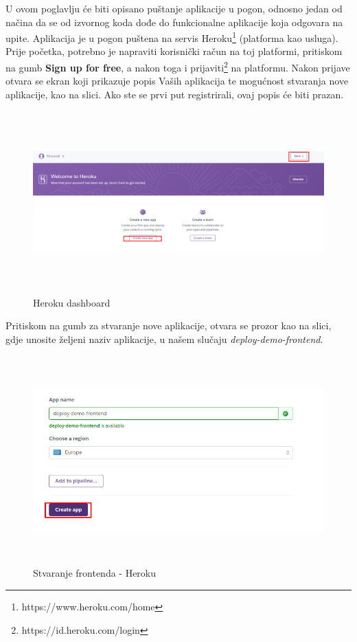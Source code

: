 			U ovom poglavlju će biti opisano puštanje aplikacije u pogon, odnosno jedan od načina da se od izvornog koda dođe do funkcionalne aplikacije koja odgovara na upite.
			Aplikacija je u pogon puštena na servis Heroku\footnote{https://www.heroku.com/home} (platforma kao usluga). Prije početka, potrebno je napraviti korisnički račun na toj platformi, pritiskom na gumb \textbf{Sign up for free}, a nakon toga i prijaviti\footnote{https://id.heroku.com/login} na platformu. Nakon prijave otvara se ekran koji prikazuje popis Vaših aplikacija te mogućnost stvaranja nove aplikacije, kao na slici. Ako ste se prvi put registrirali, ovaj popis će biti prazan.
			\begin{figure}[H]
				\includegraphics[width=170mm, height=70mm]{slike/heroku-dash.png} %
				\centering
				\caption{Heroku dashboard}
				\label{fig:dijagramdeployment}
			\end{figure}
			\eject 
			
			Pritiskom na gumb za stvaranje nove aplikacije, otvara se prozor kao na slici, gdje unosite željeni naziv aplikacije, u našem slučaju \textit{deploy-demo-frontend}.
			
			\begin{figure}[H]
				\includegraphics[width=120mm, height=80mm]{slike/heroku-create-fr.png} %
				\centering
				\caption{Stvaranje frontenda - Heroku}
				\label{fig:dijagramdeployment}
			\end{figure}
			\eject 
			
